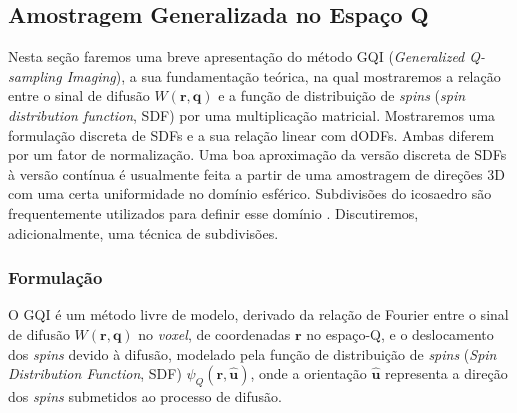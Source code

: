 \documentclass[
    12pt,                %
    oneside,            %
    a4paper,            %
    english,            %
    french,                %
    spanish,            %
    brazil                %
    ]{abntex2}
\begin{document}

\subsection{Amostragem Generalizada no Espaço Q}
\label{sec::gqi}

Nesta seção faremos uma breve apresentação do método GQI (\textit{Generalized Q-sampling Imaging}), a sua fundamentação teórica, na qual mostraremos a relação entre o sinal de difusão $W(\mathbf{r},\mathbf{q})$ e a função de distribuição de \textit{spins} (\textit{spin distribution function}, SDF) por uma multiplicação matricial. Mostraremos uma formulação discreta de SDFs e a sua relação linear com dODFs. Ambas diferem 
por um fator de normalização. Uma boa aproximação da versão discreta de SDFs à versão contínua é usualmente feita a partir de uma amostragem de direções 3D com uma certa uniformidade no domínio esférico. Subdivisões do icosaedro são frequentemente utilizados para definir esse domínio \cite{tuch2002, TuchQBall2004, descoteaux2007, yeh2010}. Discutiremos, adicionalmente, uma técnica de subdivisões.


\subsubsection{Formulação}
\label{ssec::gqi_formulacao}

O GQI é um método livre de modelo, derivado da relação de Fourier entre o sinal de difusão $W(\mathbf{r},\mathbf{q})$ no \textit{voxel}, de coordenadas $\mathbf{r}$ no espaço-Q, e o deslocamento dos \textit{spins} devido à difusão, modelado pela função de distribuição de \textit{spins} (\textit{Spin Distribution Function}, SDF) $\psi_Q(\mathbf{r}, \mathbf{\hat{u}})$, onde a orientação $\mathbf{\hat{u}}$ representa a direção dos \textit{spins} submetidos ao processo de difusão. %
\end{document}
